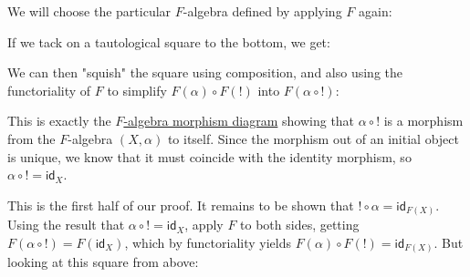 \documentclass{article}
\theoremstyle{plain}
\theoremstyle{definition}
\begin{document}
We will choose the particular \ensuremath{F}-algebra defined by applying \ensuremath{F} again:


\begin{center}
\end{center}


If we tack on a tautological square to the bottom, we get:

 
\begin{center}
\end{center}


We can then "squish" the square using composition, and also using the functoriality of \ensuremath{F} to simplify \ensuremath{F\left( \alpha \right) \circ F\left( ! \right)} into \ensuremath{F\left( \alpha \circ ! \right)}:

 
\begin{center}
\end{center}


This is exactly the \href{}{\ensuremath{F}-algebra morphism diagram} showing that \ensuremath{\alpha \circ !} is a morphism from the \ensuremath{F}-algebra \ensuremath{\left( X, \alpha \right)} to itself. Since the morphism out of an initial object is unique, we know that it must coincide with the identity morphism, so \ensuremath{\alpha \circ ! = {\mathsf{id}}_{X}}.

This is the first half of our proof. It remains to be shown that \ensuremath{! \circ \alpha = {\mathsf{id}}_{F\left( X \right)}}. Using the result that \ensuremath{\alpha \circ ! = {\mathsf{id}}_{X}}, apply \ensuremath{F} to both sides, getting \ensuremath{F\left( \alpha \circ ! \right) = F\left( {\mathsf{id}}_{X} \right)}, which by functoriality yields \ensuremath{F\left( \alpha \right) \circ F\left( ! \right) = {\mathsf{id}}_{F\left( X \right)}}. But looking at this square from above:
\end{document}
